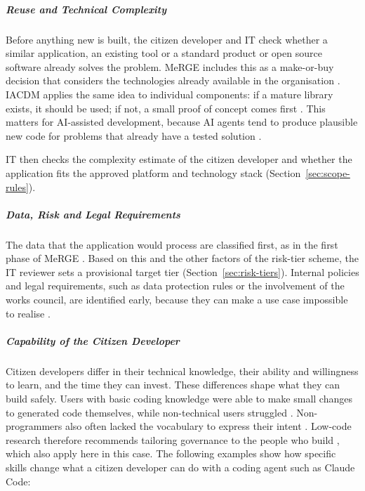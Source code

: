 \documentclass[10pt,a4paper]{article}
\begin{document}
\subparagraph{Reuse and Technical Complexity}

Before anything new is built, the citizen developer and IT check whether a similar application, an existing  tool or a standard product or open source software already solves the problem. MeRGE includes this as a make-or-buy decision that considers the technologies already available in the organisation \parencite{fetzer2026}. IACDM applies the same idea to individual components: if a mature library exists, it should be used; if not, a small proof of concept comes first \parencite{moreira2026}. This matters for AI-assisted development, because AI agents tend to produce plausible new code for problems that already have a tested solution \parencite{moreira2026}.

IT then checks the complexity estimate of the citizen developer and
whether the application fits the approved platform and technology
stack (Section~\ref{sec:scope-rules}).
\subparagraph{Data, Risk and Legal Requirements}

The data that the application would process are classified first, as in
the first phase of MeRGE \parencite{fetzer2026}. Based on this and the
other factors of the risk-tier scheme, the IT reviewer sets a provisional
target tier (Section~\ref{sec:risk-tiers}). Internal policies and legal
requirements, such as data protection rules or the involvement of the
works council, are identified early, because they can make a use case
impossible to realise \parencite{fetzer2026}.

\subparagraph{Capability of the Citizen Developer}

Citizen developers differ in their technical knowledge, their ability and willingness to learn, and the time they can invest. These differences shape what they can build safely. Users with basic coding knowledge were able to make small changes to generated code themselves, while non-technical users struggled \parencite{kobiella2026}. Non-programmers also often lacked the vocabulary to express their intent \parencite{feldman2024}. Low-code research therefore recommends tailoring governance to the people who build \parencite{viljoen2024}, which also apply here in this case. The following examples show how specific skills change what a citizen developer can do with a coding agent such as Claude Code:
\end{document}
